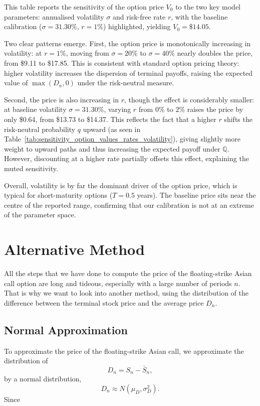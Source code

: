 \documentclass[hidelinks, 12pt, a4paper]{article}
\theoremstyle{definition}
\begin{document}
This table reports the sensitivity of the option price $V_0$ to the two key model 
parameters: annualised volatility $\sigma$ and risk-free rate $r$, with the baseline 
calibration ($\sigma = 31.30\%$, $r = 1\%$) highlighted, yielding $V_0 = \$14.05$.

Two clear patterns emerge. First, the option price is monotonically increasing in 
volatility: at $r = 1\%$, moving from $\sigma = 20\%$ to $\sigma = 40\%$ nearly 
doubles the price, from \$9.11 to \$17.85. This is consistent with standard option 
pricing theory: higher volatility increases the dispersion of terminal payoffs, 
raising the expected value of $\max(D_n, 0)$ under the risk-neutral measure.

Second, the price is also increasing in $r$, though the effect is considerably 
smaller: at baseline volatility $\sigma = 31.30\%$, varying $r$ from $0\%$ to $2\%$ 
raises the price by only \$0.64, from \$13.73 to \$14.37. This reflects the fact 
that a higher $r$ shifts the risk-neutral probability $q$ upward (as seen in Table~\ref{tab:sensitivity_option_values_rates_volatility}), 
giving slightly more weight to upward paths and thus increasing the expected payoff 
under $\mathbb{Q}$. However, discounting at a higher rate partially offsets this 
effect, explaining the muted sensitivity.

Overall, volatility is by far the dominant driver of the option price, which is 
typical for short-maturity options ($T = 0.5$ years). The baseline price sits near 
the centre of the reported range, confirming that our calibration is not at an 
extreme of the parameter space.

\newpage


\section{Alternative Method}
\label{sec:normal}

All the steps that we have done to compute the price of the floating-strike Asian 
call option are long and tideous, especially with a large number of periods $n$.
That is why we want to look into another method, using the distribution of the 
difference between the terminal stock price and the average price $D_n$.
\subsection{Normal Approximation}

To approximate the price of the floating-strike Asian call, we approximate
the distribution of
\begin{equation}
D_n = S_n - \bar S_n,
\end{equation}
by a normal distribution,
\begin{equation}
D_n \approx N(\mu_D,\sigma_D^2).
\end{equation}
Since
\end{document}
